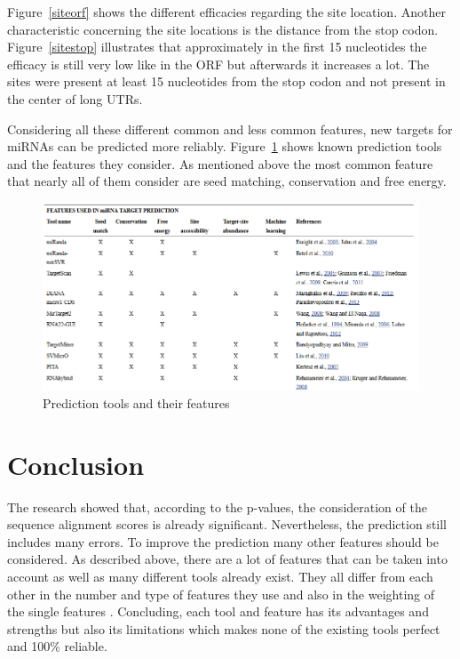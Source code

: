 \documentclass[12pt]{article}
\begin{document}
Figure~\ref{siteorf} shows the different efficacies regarding the site location. Another characteristic concerning the site locations is the distance from the stop codon. Figure~\ref{sitestop} illustrates that approximately in the first 15 nucleotides the efficacy is still very low like in the ORF but afterwards it increases a lot. 
The sites were present at least 15 nucleotides from the stop codon and not present in the center of long UTRs. 
   
Considering all these different common and less common features, new targets for miRNAs can be predicted more reliably. Figure~\ref{fig:tools} shows known prediction tools and the features they consider. As mentioned above the most common feature that nearly all of them consider are seed matching, conservation and free energy. 


\begin{figure}[h]
\centering
\includegraphics[scale=0.5]{results/tools.PNG}
\caption{Prediction tools and their features}
\label{fig:tools}
\end{figure}


\vspace{2cm}

\section{Conclusion}

The research showed that, according to the p-values, the consideration of the sequence alignment scores is already significant. Nevertheless, the prediction still includes many errors. To improve the prediction many other features should be considered.
As described above, there are a lot of features that can be taken into account as well as many different tools already exist. They all differ from each other in the number and type of features they use and also in the weighting of the single features \cite{Peterson}. Concluding, each tool and feature has its advantages and strengths but also its limitations which makes none of the existing tools perfect and 100\% reliable.
\end{document}
